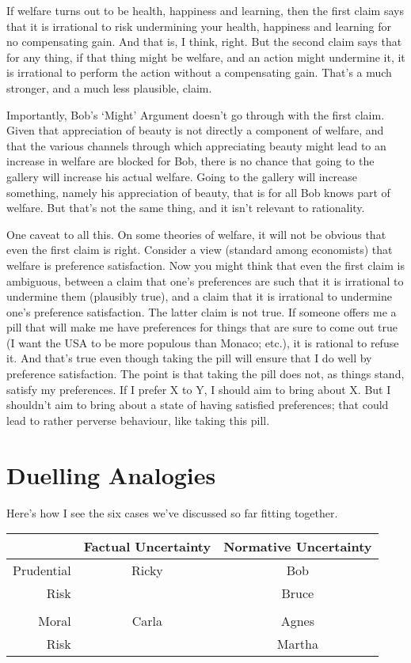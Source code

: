 \documentclass[
  11pt,
  letterpaper,
  DIV=11,
  numbers=noendperiod,
  twoside]{scrartcl}
\begin{document}
If welfare turns out to be health, happiness and learning, then the
first claim says that it is irrational to risk undermining your health,
happiness and learning for no compensating gain. And that is, I think,
right. But the second claim says that for any thing, if that thing might
be welfare, and an action might undermine it, it is irrational to
perform the action without a compensating gain. That's a much stronger,
and a much less plausible, claim.

Importantly, Bob's `Might' Argument doesn't go through with the first
claim. Given that appreciation of beauty is not directly a component of
welfare, and that the various channels through which appreciating beauty
might lead to an increase in welfare are blocked for Bob, there is no
chance that going to the gallery will increase his actual welfare. Going
to the gallery will increase something, namely his appreciation of
beauty, that is for all Bob knows part of welfare. But that's not the
same thing, and it isn't relevant to rationality.

One caveat to all this. On some theories of welfare, it will not be
obvious that even the first claim is right. Consider a view (standard
among economists) that welfare is preference satisfaction. Now you might
think that even the first claim is ambiguous, between a claim that one's
preferences are such that it is irrational to undermine them (plausibly
true), and a claim that it is irrational to undermine one's preference
satisfaction. The latter claim is not true. If someone offers me a pill
that will make me have preferences for things that are sure to come out
true (I want the USA to be more populous than Monaco; etc.), it is
rational to refuse it. And that's true even though taking the pill will
ensure that I do well by preference satisfaction. The point is that
taking the pill does not, as things stand, satisfy my preferences. If I
prefer X to Y, I should aim to bring about X. But I shouldn't aim to
bring about a state of having satisfied preferences; that could lead to
rather perverse behaviour, like taking this pill.

\section{Duelling Analogies}\label{duellinganalogies}

Here's how I see the six cases we've discussed so far fitting together.

\begin{longtable}[]{@{}rcc@{}}
\toprule\noalign{}
& Factual Uncertainty & Normative Uncertainty \\
\midrule\noalign{}
\endhead
\bottomrule\noalign{}
\endlastfoot
Prudential & Ricky & Bob \\
Risk & & Bruce \\
& & \\
Moral & Carla & Agnes \\
Risk & & Martha \\
\end{longtable}
\end{document}
